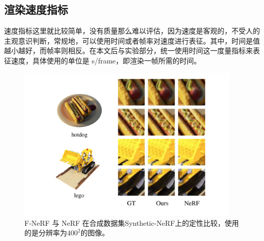 \subsection{渲染速度指标}
速度指标这里就比较简单，没有质量那么难以评估，因为速度是客观的，不受人的主观意识判断，常规地，可以使用时间或者帧率对速度进行表征。其中，时间是值越小越好，而帧率则相反。在本文后与实验部分，统一使用时间这一度量指标来表征速度，具体使用的单位是 s/frame，即渲染一帧所需的时间。


\begin{figure}[tbhp]
    \centering
    \includegraphics[width=0.95\textwidth]{figures/synthetic.pdf}
    \caption{F-NeRF 与 NeRF 在合成数据集Synthetic-NeRF上的定性比较，使用的是分辨率为$400^2$的图像。}
    \label{fig:synthetic}
\end{figure}

